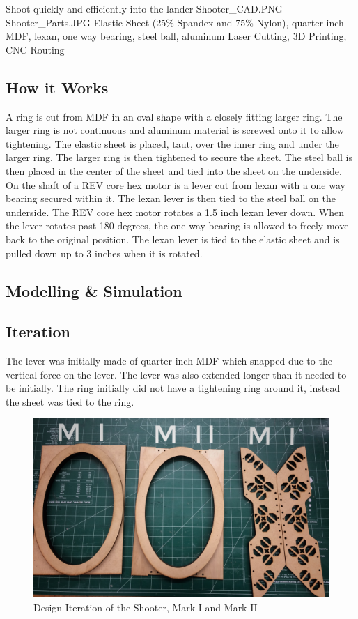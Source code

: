 {Shoot quickly and efficiently into the lander} %
{Shooter_CAD.PNG}%
{Shooter_Parts.JPG}%
{Elastic Sheet (25\% Spandex and 75\% Nylon), quarter inch MDF, lexan, one way bearing, steel ball, aluminum}%
{Laser Cutting, 3D Printing, CNC Routing}%


\subsection*{How it Works}
 A ring is cut from MDF in an oval shape with a closely fitting larger ring. The larger ring is not continuous and aluminum material is screwed onto it to allow tightening. The elastic sheet is placed, taut, over the inner ring and under the larger ring. The larger ring is then tightened to secure the sheet. The steel ball is then placed in the center of the sheet and tied into the sheet on the underside. On the shaft of a REV core hex motor is a lever cut from lexan with a one way bearing secured within it. The lexan lever is then tied to the steel ball on the underside. The REV core hex motor rotates a 1.5 inch lexan lever down. When the lever rotates past 180 degrees, the one way bearing is allowed to freely move back to the original position. The lexan lever is tied to the elastic sheet and is pulled down up to 3 inches when it is rotated. 

\subsection*{Modelling \& Simulation}


\subsection*{Iteration}
The lever was initially made of quarter inch MDF which snapped due to the vertical force on the lever. The lever was also extended longer than it needed to be initially. The ring initially did not have a tightening ring around it, instead the sheet was tied to the ring.


\begin{figure}[htp]
\centering
\includegraphics[width=.8\linewidth]{Design_Overview/Shooter_Iteration.JPG}
\caption{Design Iteration of the Shooter, Mark I and Mark II}
\label{fig:iteration}
\end{figure}

